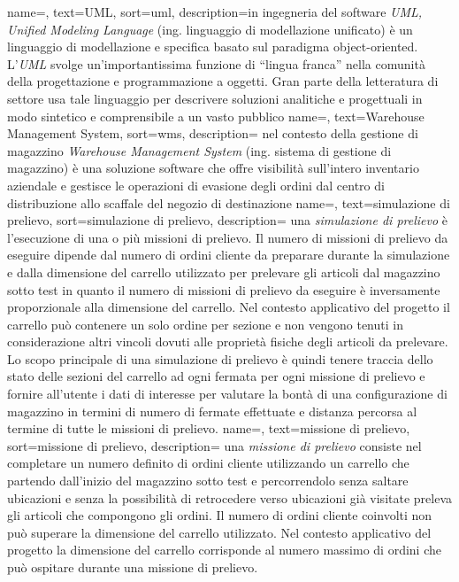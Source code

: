  {
    name=,
    text=UML,
    sort=uml,
    description={in ingegneria del software \emph{UML, Unified Modeling Language} (ing. linguaggio di modellazione unificato) è un linguaggio di modellazione e specifica basato sul paradigma object-oriented. L'\emph{UML} svolge un'importantissima funzione di ``lingua franca'' nella comunità della progettazione e programmazione a oggetti. Gran parte della letteratura di settore usa tale linguaggio per descrivere soluzioni analitiche e progettuali in modo sintetico e comprensibile a un vasto pubblico}
}
 {
    name=,
    text=Warehouse Management System,
    sort=wms,
    description={ nel contesto della gestione di magazzino \emph{Warehouse Management System} (ing. sistema di gestione di magazzino) è una soluzione software che offre visibilità sull'intero inventario aziendale e gestisce le operazioni di evasione degli ordini dal centro di distribuzione allo scaffale del negozio di destinazione}
}
 {
    name=,
    text=simulazione di prelievo,
    sort=simulazione di prelievo,
    description={ una \emph{simulazione di prelievo} è l'esecuzione di una o più missioni di prelievo.
    Il numero di missioni di prelievo da eseguire dipende dal numero di ordini cliente da preparare durante la simulazione
    e dalla dimensione del carrello utilizzato per prelevare gli articoli dal magazzino sotto test in quanto il 
    numero di missioni di prelievo da eseguire è inversamente proporzionale alla dimensione del carrello.
    Nel contesto applicativo del progetto il carrello può contenere un solo ordine per sezione e non vengono tenuti in 
    considerazione altri vincoli dovuti alle proprietà fisiche degli articoli da prelevare.
    Lo scopo principale di una simulazione di prelievo è quindi tenere traccia dello stato delle sezioni del carrello 
    ad ogni fermata per ogni missione di prelievo e fornire all'utente i dati di interesse per valutare la bontà di una
    configurazione di magazzino in termini di numero di fermate effettuate e distanza percorsa al termine di tutte le missioni 
    di prelievo. 
    }}
 {
    name=,
    text=missione di prelievo,
    sort=missione di prelievo,
    description={ una \emph{missione di prelievo} consiste nel completare un numero definito di ordini cliente
    utilizzando un carrello che partendo dall'inizio del magazzino sotto test e percorrendolo
    senza saltare ubicazioni e senza la possibilità di retrocedere verso ubicazioni già
    visitate preleva gli articoli che compongono gli ordini.
    Il numero di ordini cliente coinvolti non può superare la dimensione del carrello utilizzato.
    Nel contesto applicativo del progetto la dimensione del carrello corrisponde al numero massimo di ordini che può 
    ospitare durante una missione di prelievo.
    }}

